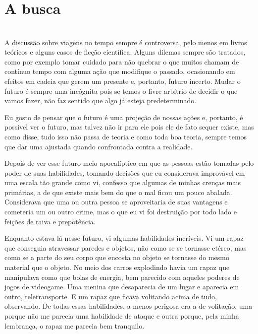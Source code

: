 
\newpage


\ifdefined\useChapters
\chapter{A busca}
\else
\chapter{}
\fi


A discussão sobre viagens no tempo sempre é controversa, pelo menos em livros teóricos e alguns casos de ficção científica. Alguns dilemas sempre são tratados, como por exemplo tomar cuidado para não quebrar o que muitos chamam de contínuo tempo com alguma ação que modifique o passado, ocasionando em efeitos em cadeia que gerem um presente e, portanto, futuro incerto. Mudar o futuro é sempre uma incógnita pois se temos o livre arbítrio de decidir o que vamos fazer, não faz sentido que algo já esteja predeterminado.

Eu gosto de pensar que o futuro é uma projeção de nossas ações e, portanto, é possível ver o futuro, mas talvez não ir para ele pois ele de fato sequer existe, mas como disse, tudo isso não passa de teoria e como toda boa teoria, sempre temos que dar uma ajustada quando confrontada contra a realidade.

Depois de ver esse futuro meio apocalíptico em que as pessoas estão tomadas pelo poder de suas habilidades, tomando decisões que eu considerava improvável em uma escala tão grande como vi, confesso que algumas de minhas crenças mais primárias, a de que existe mais bem do que o mal ficou um pouco abalada. Considerava que uma ou outra pessoa se aproveitaria de suas vantagens e cometeria um ou outro crime, mas o que eu vi foi destruição por todo lado e feições de raiva e prepotência.

Enquanto estava lá nesse futuro, vi algumas habilidades incríveis. Vi um rapaz que conseguia atravessar paredes e objetos, não como se se tornasse etéreo, mas como se a parte do seu corpo que encosta no objeto se tornasse do mesmo material que o objeto. No meio dos carros explodindo havia um rapaz que manipulava como que bolas de energia, bem parecido com aqueles poderes de jogos de videogame. Uma menina que desaparecia de um lugar e aparecia em outro, teletransporte. E um rapaz que ficava volitando acima de tudo, observando. De todas essas habilidades, a menos perigosa era a de volitação, uma porque não me parecia uma habilidade de ataque e outra porque, pela minha lembrança, o rapaz me parecia bem tranquilo.

